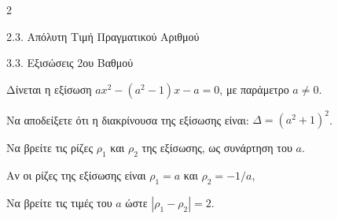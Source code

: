 \begin{ylh}{2}
    \item 2.3. Απόλυτη Τιμή Πραγματικού Αριθμού
    \item 3.3. Εξισώσεις 2ου Βαθμού
\end{ylh}
Δίνεται η εξίσωση $a x^2 - (a^2 - 1)x - a = 0$, με παράμετρο $a \neq 0$.

\begin{alist}
\item Να αποδείξετε ότι η διακρίνουσα της εξίσωσης είναι: $\Delta = (a^2 + 1)^2$. 
\item Να βρείτε τις ρίζες $\rho_1$ και $\rho_2$ της εξίσωσης, ως συνάρτηση του $a$. 

Αν οι ρίζες της εξίσωσης είναι $\rho_1 = a$ και $\rho_2 = -1/a$,
\item Να βρείτε τις τιμές του $a$ ώστε $|\rho_1 - \rho_2| = 2$. 
\end{alist}

